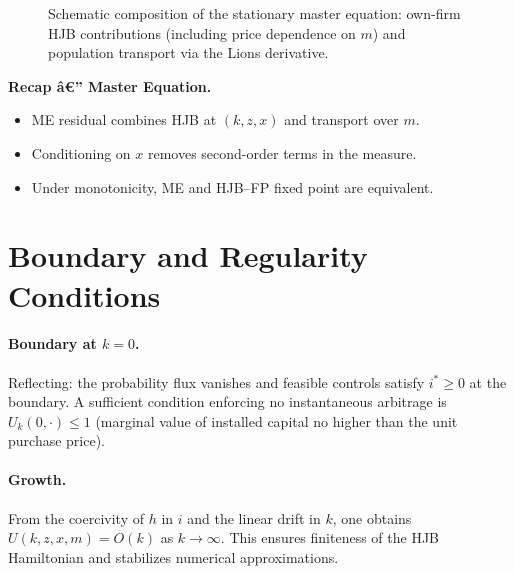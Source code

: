 ﻿\documentclass[11pt,letterpaper,oneside]{article}
\numberwithin{equation}{section}
\newcommand{\1}{\mathbf{1}}
\newcommand{\Dm}{D\_m}
\begin{document}
\begin{figure}[ht]
\centering
{}
\caption{Schematic composition of the stationary master equation: own-firm HJB contributions (including price dependence on $m$) and population transport via the Lions derivative.}
\end{figure}

\begin{tcolorbox}[didacticstyle]
\textbf{Recap â€” Master Equation.}
\begin{itemize}[leftmargin=1.15em,itemsep=0.2em]
  \item ME residual combines HJB at $(k,z,x)$ and transport over $m$.
  \item Conditioning on $x$ removes second-order terms in the measure.
  \item Under monotonicity, ME and HJB--FP fixed point are equivalent.
\end{itemize}
\end{tcolorbox}

\section{Boundary and Regularity Conditions}

\paragraph{Boundary at $k=0$.} Reflecting: the probability flux vanishes and feasible controls satisfy $i^*\ge 0$ at the boundary. A sufficient condition enforcing no instantaneous arbitrage is $U_k(0,\cdot)\le 1$ (marginal value of installed capital no higher than the unit purchase price).

\paragraph{Growth.} From the coercivity of $h$ in $i$ and the linear drift in $k$, one obtains $U(k,z,x,m)=O(k)$ as $k\to\infty$. This ensures finiteness of the HJB Hamiltonian and stabilizes numerical approximations.
\end{document}
